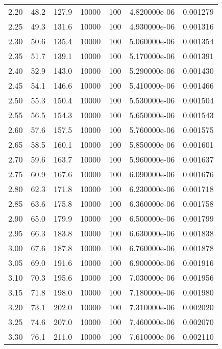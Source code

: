 \begin{tabular}{rrrrrrr}
    2.20 &      48.2 &     127.9 & 10000 &  100 & 4.820000e-06 & 0.001279 \\
    2.25 &      49.3 &     131.6 & 10000 &  100 & 4.930000e-06 & 0.001316 \\
    2.30 &      50.6 &     135.4 & 10000 &  100 & 5.060000e-06 & 0.001354 \\
    2.35 &      51.7 &     139.1 & 10000 &  100 & 5.170000e-06 & 0.001391 \\
    2.40 &      52.9 &     143.0 & 10000 &  100 & 5.290000e-06 & 0.001430 \\
    2.45 &      54.1 &     146.6 & 10000 &  100 & 5.410000e-06 & 0.001466 \\
    2.50 &      55.3 &     150.4 & 10000 &  100 & 5.530000e-06 & 0.001504 \\
    2.55 &      56.5 &     154.3 & 10000 &  100 & 5.650000e-06 & 0.001543 \\
    2.60 &      57.6 &     157.5 & 10000 &  100 & 5.760000e-06 & 0.001575 \\
    2.65 &      58.5 &     160.1 & 10000 &  100 & 5.850000e-06 & 0.001601 \\
    2.70 &      59.6 &     163.7 & 10000 &  100 & 5.960000e-06 & 0.001637 \\
    2.75 &      60.9 &     167.6 & 10000 &  100 & 6.090000e-06 & 0.001676 \\
    2.80 &      62.3 &     171.8 & 10000 &  100 & 6.230000e-06 & 0.001718 \\
    2.85 &      63.6 &     175.8 & 10000 &  100 & 6.360000e-06 & 0.001758 \\
    2.90 &      65.0 &     179.9 & 10000 &  100 & 6.500000e-06 & 0.001799 \\
    2.95 &      66.3 &     183.8 & 10000 &  100 & 6.630000e-06 & 0.001838 \\
    3.00 &      67.6 &     187.8 & 10000 &  100 & 6.760000e-06 & 0.001878 \\
    3.05 &      69.0 &     191.6 & 10000 &  100 & 6.900000e-06 & 0.001916 \\
    3.10 &      70.3 &     195.6 & 10000 &  100 & 7.030000e-06 & 0.001956 \\
    3.15 &      71.8 &     198.0 & 10000 &  100 & 7.180000e-06 & 0.001980 \\
    3.20 &      73.1 &     202.0 & 10000 &  100 & 7.310000e-06 & 0.002020 \\
    3.25 &      74.6 &     207.0 & 10000 &  100 & 7.460000e-06 & 0.002070 \\
    3.30 &      76.1 &     211.0 & 10000 &  100 & 7.610000e-06 & 0.002110 \\

\end{tabular}
